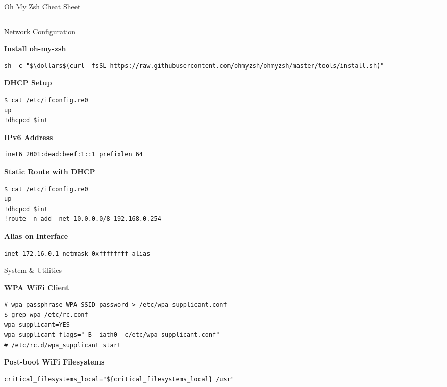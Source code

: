 \documentclass[10pt]{article}
\begin{document}
\pagestyle{empty}

{\titlefont\large \color{mygreen}Oh My Zsh Cheat Sheet}\\
\rule{\linewidth}{0.5pt}
\vspace{0.5em}

\setlength{\columnsep}{20pt}
\begin{multicols}{2}

{\titlefont\color{blueheader}\faNetworkWired\quad Network Configuration}\vspace{5pt}

\textbf{\color{blueheader}Install oh-my-zsh}
\begin{lstlisting}
sh -c "$\dollars$(curl -fsSL https://raw.githubusercontent.com/ohmyzsh/ohmyzsh/master/tools/install.sh)"
\end{lstlisting}

\textbf{\color{blueheader}DHCP Setup}
\begin{lstlisting}
$ cat /etc/ifconfig.re0  
up  
!dhcpcd $int
\end{lstlisting}

\textbf{\color{blueheader}IPv6 Address}
\begin{lstlisting}
inet6 2001:dead:beef:1::1 prefixlen 64
\end{lstlisting}

\textbf{\color{blueheader}Static Route with DHCP}
\begin{lstlisting}
$ cat /etc/ifconfig.re0  
up  
!dhcpcd $int
!route -n add -net 10.0.0.0/8 192.168.0.254
\end{lstlisting}

\textbf{\color{blueheader}Alias on Interface}
\begin{lstlisting}
inet 172.16.0.1 netmask 0xffffffff alias
\end{lstlisting}

\vfill\null\columnbreak

{\titlefont\color{blueheader}\faTools\quad System & Utilities}\vspace{5pt}

\textbf{\color{blueheader}WPA WiFi Client}
\begin{lstlisting}
# wpa_passphrase WPA-SSID password > /etc/wpa_supplicant.conf
$ grep wpa /etc/rc.conf
wpa_supplicant=YES
wpa_supplicant_flags="-B -iath0 -c/etc/wpa_supplicant.conf"
# /etc/rc.d/wpa_supplicant start
\end{lstlisting}

\textbf{\color{blueheader}Post-boot WiFi Filesystems}
\begin{lstlisting}
critical_filesystems_local="${critical_filesystems_local} /usr"
\end{lstlisting}


\end{multicols}
\end{document}
